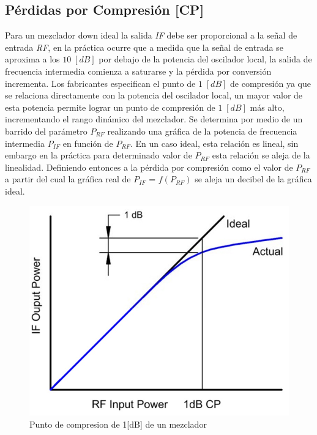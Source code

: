 \documentclass[twocolumn]{article}
\begin{document}
\subsection{Pérdidas por Compresión [CP]}
Para un mezclador down ideal la salida \textit{IF} debe ser proporcional a la señal de entrada \textit{RF}, en la práctica ocurre que a medida que la señal de entrada se aproxima a los $10\;[dB]$ por debajo de la potencia del oscilador local, la salida de frecuencia intermedia comienza a saturarse y la pérdida por conversión incrementa. Los fabricantes especifican el punto de $1 \; [dB]$ de compresión ya que se relaciona directamente con la potencia del oscilador local, un mayor valor de esta potencia permite lograr un punto de compresión de $1 \; [dB]$ más alto, incrementando el rango dinámico del mezclador. Se determina por medio de un barrido del parámetro $P_{RF}$ realizando una gráfica de la potencia de frecuencia intermedia $P_{IF}$ en función de $P_{RF}$. En un caso ideal, esta relación es lineal, sin embargo en la práctica para determinado valor de $P_{RF}$ esta relación se aleja de la linealidad. Definiendo entonces a la pérdida por compresión como el valor de $P_{RF}$ a partir del cual la gráfica real de $P_{IF}$ = $f(P_{RF})$ se aleja un decibel de la gráfica ideal. 

\begin{figure}[!ht]
  \centering    
	\includegraphics[scale=0.45]{imagenes/fig4.jpg}
	\caption{Punto de compresion de 1[dB] de un mezclador}\label{fig:fig4}
\end{figure}
\end{document}
